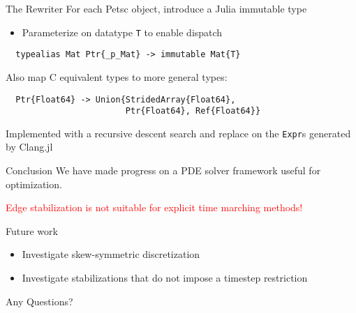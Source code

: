\documentclass{beamer}
\begin{document}
\begin{frame}[fragile]{The Rewriter}
For each Petsc object, introduce a Julia immutable type
\begin{itemize}
  \item Parameterize on datatype \texttt{T} to enable dispatch
\end{itemize}
\begin{verbatim}
  typealias Mat Ptr{_p_Mat} -> immutable Mat{T}
\end{verbatim}
\hfill

Also map C equivalent types to more general types:
\begin{verbatim} 
  Ptr{Float64} -> Union{StridedArray{Float64},
                        Ptr{Float64}, Ref{Float64}}
\end{verbatim}
\hfill

Implemented with a recursive descent search and replace on the \texttt{Expr}s 
generated by Clang.jl

\end{frame}



\begin{frame}{Conclusion}
We have made progress on a PDE solver framework useful for optimization.

\hfill \break
\textcolor{red}{Edge stabilization is not suitable for explicit time marching methods!}

\hfill \break
Future work
\begin{itemize}
  \item Investigate skew-symmetric discretization
  \item Investigate stabilizations that do not impose a timestep restriction
\end{itemize}
\end{frame}




\begin{frame}
\begin{center}  
Any Questions?
\end{center}

\end{frame}
\end{document}

